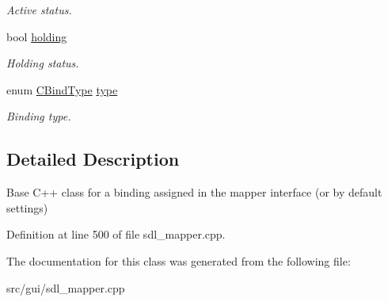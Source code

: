 \begin{DoxyCompactItemize}
\begin{DoxyCompactList}\small\item\em Active status. \end{DoxyCompactList}\item 
\hypertarget{classCBind_a4a0d6d7650d3a24cc0bc68c985d26ade}{bool \hyperlink{classCBind_a4a0d6d7650d3a24cc0bc68c985d26ade}{holding}}\label{classCBind_a4a0d6d7650d3a24cc0bc68c985d26ade}

\begin{DoxyCompactList}\small\item\em Holding status. \end{DoxyCompactList}\item 
\hypertarget{classCBind_a9e5121ab697c2c56cb20a20bd151ac45}{enum \hyperlink{classCBind_a6bd04329a3b3b8673f7bd4469f92eb61}{C\-Bind\-Type} \hyperlink{classCBind_a9e5121ab697c2c56cb20a20bd151ac45}{type}}\label{classCBind_a9e5121ab697c2c56cb20a20bd151ac45}

\begin{DoxyCompactList}\small\item\em Binding type. \end{DoxyCompactList}\end{DoxyCompactItemize}


\subsection{Detailed Description}
Base C++ class for a binding assigned in the mapper interface (or by default settings) 

Definition at line 500 of file sdl\-\_\-mapper.\-cpp.



The documentation for this class was generated from the following file\-:\begin{DoxyCompactItemize}
\item 
src/gui/sdl\-\_\-mapper.\-cpp\end{DoxyCompactItemize}
